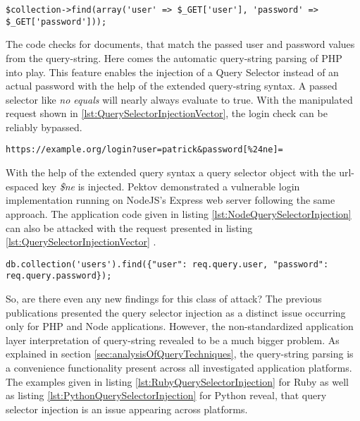 \begin{lstlisting}[caption={Vulnerable PHP example for query selector injection on MongoDB}, label={lst:PHPQuerySelectorInjection}]
$collection->find(array('user' => $_GET['user'], 'password' => $_GET['password']));
\end{lstlisting}

The code checks for documents, that match the passed user and password values from the query-string. Here comes the automatic query-string parsing of PHP into play. This feature enables the injection of a Query Selector instead of an actual password with the help of the extended query-string syntax. A passed selector like \emph{no equals} will nearly always evaluate to true. With the manipulated request shown in \ref{lst:QuerySelectorInjectionVector}, the login check can be reliably bypassed. \\

\begin{lstlisting}[caption={Attack vector on MongoDB for query selector injection via the query-string parameter}, label={lst:QuerySelectorInjectionVector}]
https://example.org/login?user=patrick&password[%24ne]=
\end{lstlisting}

With the help of the extended query syntax a query selector object with the url-espaced key \emph{\$ne} is injected. Pektov \cite{Petkov:2014a} demonstrated a vulnerable login implementation running on NodeJS's Express web server following the same approach. The application code given in listing \ref{lst:NodeQuerySelectorInjection} can also be attacked with the request presented in listing \ref{lst:QuerySelectorInjectionVector} . \\

\begin{lstlisting}[caption={Vulnerable NodeJS example for query selector injection on MongoDB}, label={lst:NodeQuerySelectorInjection}]
db.collection('users').find({"user": req.query.user, "password": req.query.password});
\end{lstlisting}

So, are there even any new findings for this class of attack? The previous publications presented the query selector injection as a distinct issue occurring only for PHP and Node applications. However, the non-standardized application layer interpretation of query-string revealed to be a much bigger problem. As explained in section \ref{sec:analysisOfQueryTechniques}, the query-string parsing is a convenience functionality present across all investigated application platforms. The examples given in listing \ref{lst:RubyQuerySelectorInjection} for Ruby as well as listing \ref{lst:PythonQuerySelectorInjection} for Python reveal, that query selector injection is an issue appearing across platforms. \\

